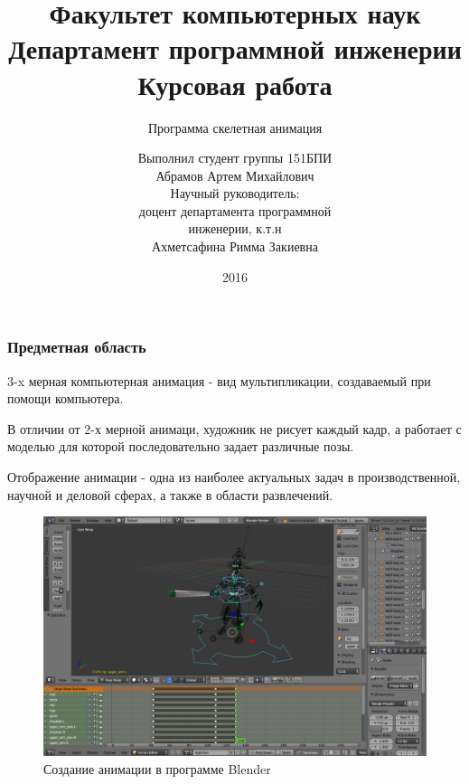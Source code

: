 \documentclass{beamer}
\title[Курсовая работа]{\scriptsize{%
Факультет компьютерных наук \\%
Департамент программной инженерии \\%
Курсовая работа \\%
}}
\subtitle{Программа скелетная анимация}
\author[Абрамов Артем 151 БПИ]{\scriptsize{%
Выполнил студент группы 151БПИ \\%
Абрамов Артем Михайлович \\%
Научный руководитель: \\%
доцент департамента программной \\%
инженерии, к.т.н \\%
Ахметсафина Римма Закиевна}}
\date{2016}
\begin{document}

\frame[plain]{\titlepage}	%




\begin{frame}
\frametitle{Предметная область}
\begin{multicols}{2}
\begin{small}
    3-x мерная компьютерная анимация - вид мультипликации, создаваемый при помощи компьютера. 
    \medskip
    
    В отличии от 2-х мерной анимаци, художник не рисует каждый кадр, а работает с моделью для которой последовательно задает различные позы.

    \medskip 
    Отображение анимации - одна из наиболее актуальных задач  в производственной, научной и деловой сферах, а также в области развлечений.
\end{small}

\columnbreak
    
\begin{figure}[h!]
    \centering
    \includegraphics[width=1.15\columnwidth]{blender_at_work.png}
    \caption{Создание анимации в программе Blender}
\end{figure}

\end{multicols}
\end{frame}
\end{document}

